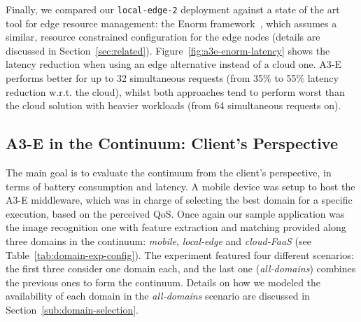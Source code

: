 Finally, we compared our \texttt{local-edge-2} deployment against a state of the art tool for edge resource management: the Enorm framework~\cite{wang2017enorm}, which assumes a similar, resource constrained configuration for the edge nodes (details are discussed in Section~\ref{sec:related}). Figure~\ref{fig:a3e-enorm-latency} shows the latency reduction when using an edge alternative instead of a cloud one. A3-E performs better for up to 32 simultaneous requests (from 35\% to 55\% latency reduction w.r.t. the cloud), whilst both approaches tend to perform worst than the cloud solution with heavier workloads (from 64 simultaneous requests on).  




\subsection{A3-E in the Continuum: Client's Perspective} 
\label{sub:exp-a3e-continuum}

The main goal is to evaluate the continuum from the client's perspective, in terms of battery consumption and latency. A mobile device was setup to host the A3-E middleware, which was in charge of selecting the best domain for a specific execution, based on the perceived QoS. 
Once again our sample application was the image recognition one with feature extraction and matching provided along three domains in the continuum: \textit{mobile}, \textit{local-edge} and \textit{cloud-FaaS} (see Table~\ref{tab:domain-exp-config}). The experiment featured four different scenarios: the first three consider one domain each, and the last one (\textit{all-domains}) combines the previous ones to form the continuum. Details on how we modeled the availability of each domain in the \textit{all-domains} scenario are discussed in Section~\ref{sub:domain-selection}.

